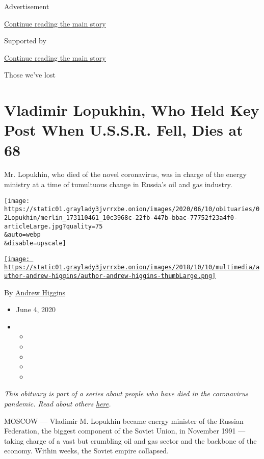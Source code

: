 Advertisement

\protect\hyperlink{after-top}{Continue reading the main story}

Supported by

\protect\hyperlink{after-sponsor}{Continue reading the main story}

Those we've lost

\hypertarget{vladimir-lopukhin-who-held-key-post-when-ussr-fell-dies-at-68}{%
\section{Vladimir Lopukhin, Who Held Key Post When U.S.S.R. Fell, Dies
at
68}\label{vladimir-lopukhin-who-held-key-post-when-ussr-fell-dies-at-68}}

Mr. Lopukhin, who died of the novel coronavirus, was in charge of the
energy ministry at a time of tumultuous change in Russia's oil and gas
industry.

\texttt{[image: https://static01.graylady3jvrrxbe.onion/images/2020/06/10/obituaries/02Lopukhin/merlin\_173110461\_10c3968c-22fb-447b-bbac-77752f23a4f0-articleLarge.jpg?quality=75\\\&auto=webp\\\&disable=upscale]}

\href{https://www.nytimes3xbfgragh.onion/by/andrew-higgins}{\texttt{[image: https://static01.graylady3jvrrxbe.onion/images/2018/10/10/multimedia/author-andrew-higgins/author-andrew-higgins-thumbLarge.png]}}

By \href{https://www.nytimes3xbfgragh.onion/by/andrew-higgins}{Andrew
Higgins}

\begin{itemize}
\item
  June 4, 2020
\item
  \begin{itemize}
  \item
  \item
  \item
  \item
  \item
  \end{itemize}
\end{itemize}

\emph{This obituary is part of a series about people who have died in
the coronavirus pandemic. Read about others}
\href{https://www.nytimes3xbfgragh.onion/interactive/2020/obituaries/people-died-coronavirus-obituaries.html}{\emph{here}}\emph{.}

MOSCOW --- Vladimir M. Lopukhin became energy minister of the Russian
Federation, the biggest component of the Soviet Union, in November 1991
--- taking charge of a vast but crumbling oil and gas sector and the
backbone of the economy. Within weeks, the Soviet empire collapsed.


